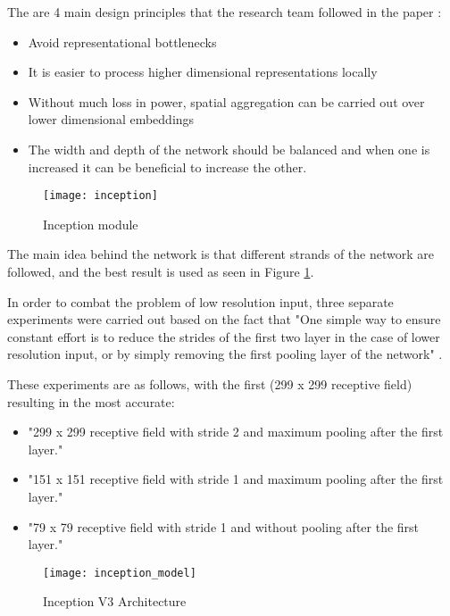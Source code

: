 The are 4 main design principles that the research team followed in the paper \parencite{rethinkingInception}:
\begin{itemize}
    \item{Avoid representational bottlenecks}
    \item{It is easier to process higher dimensional representations locally}
    \item{Without much loss in power, spatial aggregation can be carried out over lower dimensional embeddings}
    \item{The width and depth of the network should be balanced and when one is increased it can be beneficial to increase the other.}
\end{itemize}

\begin{figure}
     \texttt{[image: inception]}
     \caption{Inception module \parencite{rethinkingInception}}
     \label{fig:inception}
\end{figure}

The main idea behind the network is that different strands of the network are followed, and the best result is used as seen in Figure \ref{fig:inception}.

In order to combat the problem of low resolution input, three separate experiments were carried out based on the fact that "One simple way to ensure constant effort is to reduce the strides of the first two layer in the case of lower resolution input, or by simply removing the first pooling layer of the network" \parencite{rethinkingInception}.

These experiments are as follows, with the first (299 x 299 receptive field) resulting in the most accurate:
\begin{itemize}
    \item{"299 x 299 receptive field with stride 2 and maximum pooling after the first layer." \parencite{rethinkingInception}}
    \item{"151 x 151 receptive field with stride 1 and maximum pooling after the first layer." \parencite{rethinkingInception}}
    \item{"79 x 79 receptive field with stride 1 and without pooling after the first layer." \parencite{rethinkingInception}}
\end{itemize}

\begin{figure}
     \texttt{[image: inception\_model]}
     \caption{Inception V3 Architecture \parencite{rethinkingInception}}
     \label{fig:inception_model}
\end{figure}

